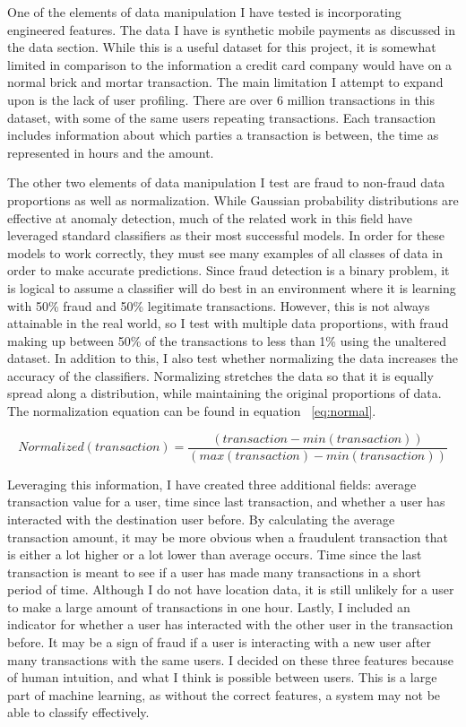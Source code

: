 \documentclass[midd]{thesis}
\begin{document}
One of the elements of data manipulation I have tested is incorporating engineered features. The data I have is synthetic mobile payments as discussed in the data section. While this is a useful dataset for this project, it is somewhat limited in comparison to the information a credit card company would have on a normal brick and mortar transaction. The main limitation I attempt to expand upon is the lack of user profiling. There are over 6 million transactions in this dataset, with some of the same users repeating transactions. Each transaction includes information about which parties a transaction is between, the time as represented in hours and the amount. 

The other two elements of data manipulation I test are fraud to non-fraud data proportions as well as normalization. While Gaussian probability distributions are effective at anomaly detection, much of the related work in this field have leveraged standard classifiers as their most successful models. In order for these models to work correctly, they must see many examples of all classes of data in order to make accurate predictions. Since fraud detection is a binary problem, it is logical to assume a classifier will do best in an environment where it is learning with 50\% fraud and 50\% legitimate transactions. However, this is not always attainable in the real world, so I test with multiple data proportions, with fraud making up between 50\% of the transactions to less than 1\% using the unaltered dataset. In addition to this, I also test whether normalizing the data increases the accuracy of the classifiers. Normalizing stretches the data so that it is equally spread along a distribution, while maintaining the original proportions of data. The normalization equation can be found in equation ~\ref{eq:normal}. 


\begin{equation}
\label{eq:normal}
Normalized(transaction) = \frac{( transaction - min(transaction))}{  (max(transaction) - min(transaction))}
\end{equation}

Leveraging this information, I have created three additional fields: average transaction value for a user, time since last transaction, and whether a user has interacted with the destination user before. By calculating the average transaction amount, it may be more obvious when a fraudulent transaction that is either a lot higher or a lot lower than average occurs. Time since the last transaction is meant to see if a user has made many transactions in a short period of time. Although I do not have location data, it is still unlikely for a user to make a large amount of transactions in one hour. Lastly, I included an indicator for whether a user has interacted with the other user in the transaction before. It may be a sign of fraud if a user is interacting with a new user after many transactions with the same users. I decided on these three features because of human intuition, and what I think is possible between users. This is a large part of machine learning, as without the correct features, a system may not be able to classify effectively.
\end{document}
